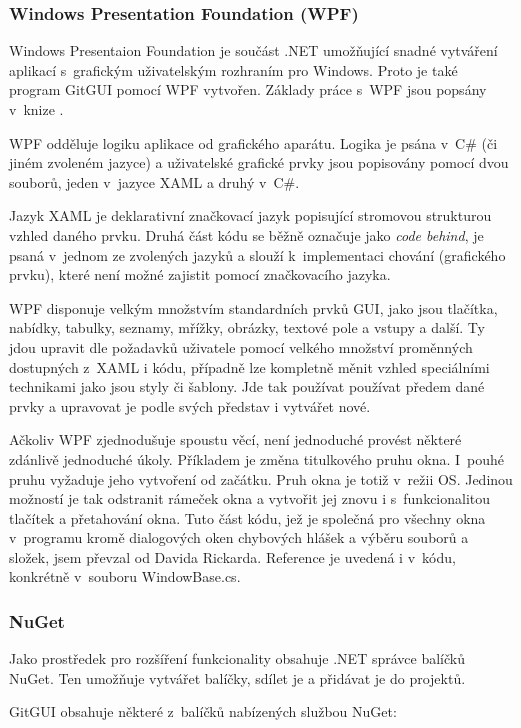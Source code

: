 \documentclass[
  biblatex,
  glossaries,
  index
]{kidiplom}
\begin{document}
\subsubsection{Windows Presentation Foundation (WPF)}
Windows Presentaion Foundation je součást .NET umožňující snadné vytváření aplikací s~grafickým uživatelským rozhraním pro Windows. Proto je také program GitGUI pomocí WPF vytvořen. Základy práce s~WPF jsou popsány v~knize \cite{wpfandcsharp}.

WPF odděluje logiku aplikace od grafického aparátu. Logika je psána v~C\# (či jiném zvoleném jazyce) a uživatelské grafické prvky jsou popisovány pomocí dvou souborů, jeden v~jazyce XAML a druhý v~C\#.

Jazyk XAML je deklarativní značkovací jazyk popisující stromovou strukturou vzhled daného prvku. Druhá část kódu se běžně označuje jako {\it code behind}, je psaná v~jednom ze zvolených jazyků a slouží k~implementaci chování (grafického prvku), které není možné zajistit pomocí značkovacího jazyka.

WPF disponuje velkým množstvím standardních prvků GUI, jako jsou tlačítka, nabídky, tabulky, seznamy, mřížky, obrázky, textové pole a vstupy a další. Ty jdou upravit dle požadavků uživatele pomocí velkého množství proměnných dostupných z~XAML i kódu, případně lze kompletně měnit vzhled speciálními technikami jako jsou styly či šablony. Jde tak používat používat předem dané prvky a upravovat je podle svých představ i vytvářet nové.

Ačkoliv WPF zjednodušuje spoustu věcí, není jednoduché provést některé zdánlivě jednoduché úkoly. Příkladem je změna titulkového pruhu okna. I~pouhé  pruhu vyžaduje jeho vytvoření od začátku. Pruh okna je totiž v~režii OS. Jedinou možností je tak odstranit rámeček okna a vytvořit jej znovu i s~funkcionalitou tlačítek a přetahování okna. Tuto část kódu, jež je společná pro všechny okna v~programu kromě dialogových oken chybových hlášek a výběru souborů a složek, jsem převzal od Davida Rickarda. Reference je uvedená i v~kódu, konkrétně v~souboru WindowBase.cs. 

\subsubsection{NuGet}
Jako prostředek pro rozšíření funkcionality obsahuje .NET správce balíčků NuGet. Ten umožňuje vytvářet balíčky, sdílet je a přidávat je do projektů.

GitGUI obsahuje některé z~balíčků nabízených službou NuGet:
\end{document}
